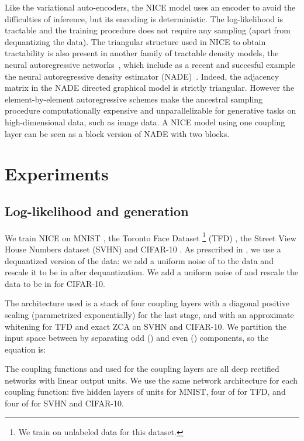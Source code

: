 \documentclass{article}
\begin{document}
Like the variational auto-encoders, the NICE model uses an encoder to avoid
the difficulties of inference, but its encoding is deterministic. The log-likelihood is tractable and the training procedure does not require any sampling (apart from dequantizing the data). 
The triangular structure used in NICE to obtain tractability is also present in another family of tractable density models, the
neural autoregressive networks~\citep{Bengio+Bengio-NIPS99}, which include as a recent and succesful example the
neural autoregressive density estimator (NADE)~\citep{Larochelle+Murray-2011}.
Indeed, the adjacency matrix in the
NADE directed graphical model is strictly triangular. However the
element-by-element autoregressive schemes make the ancestral sampling procedure computationally
expensive and unparallelizable for generative tasks on high-dimensional data, such as image data.
A NICE model using one coupling layer can be seen as a block version of NADE with two blocks.


\section{Experiments}
\subsection{Log-likelihood and generation}
We train NICE on MNIST \citep{lecun1998mnist}, the Toronto Face Dataset
\footnote{We train on unlabeled data for this dataset.}
(TFD) \citep{Susskind2010}, the Street View House Numbers dataset (SVHN)
\citep{Netzer-wkshp-2011} and CIFAR-10 \citep{Krizhevsky2010tr}. As
prescribed in \citep{Benigno-et-al-NIPS2013-small}, 
we use a dequantized version of the data: we add a uniform noise of  to the data and
rescale it to be in  after dequantization. We add a uniform noise of 
and rescale the data to be in  for CIFAR-10.


The architecture used is a stack of four coupling layers with a diagonal
positive scaling (parametrized exponentially)  for the last stage, and with an approximate
whitening for TFD and exact ZCA on SVHN and CIFAR-10.
We partition the input space between by separating odd () and even ()
components, so the equation is:






The coupling functions  and  used
for the coupling layers are all deep rectified networks
with linear output units.  We use the same network architecture for each coupling function: five hidden layers of  units for MNIST,
four of  for TFD, and four of  for SVHN and CIFAR-10. 
\end{document}
